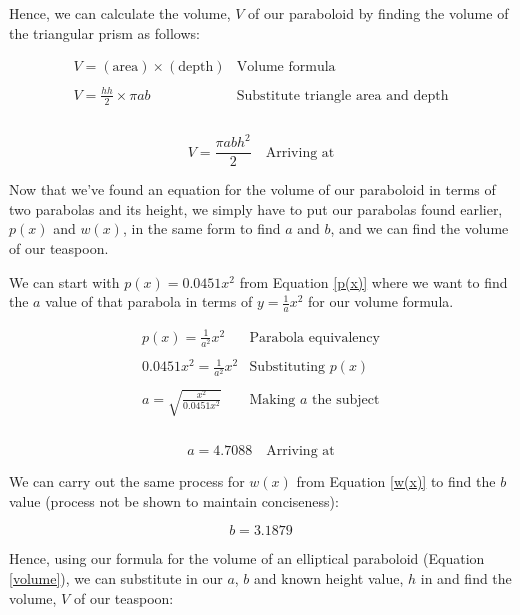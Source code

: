 \documentclass[12pt]{article}
\begin{document}
Hence, we can calculate the volume, $V$ of our paraboloid by finding the volume of the triangular prism as follows:

$$
\begin{array}{l|c}
    V = (\text{area}) \times (\text{depth}) & \text{Volume formula} \\ \\
    V = \frac{hh}{2} \times \pi ab & \text{Substitute triangle area and depth} \\ \\
 \end{array}
$$

\begin{equation}\label{volume}
    \boxed{V = \frac{\pi a b h^2}{2}}  \quad \text{Arriving at}
\end{equation}

Now that we've found an equation for the volume of our paraboloid in terms of two parabolas and its height, we simply have to put our parabolas found earlier, $p(x)$ and $w(x)$, in the same form to find $a$ and $b$, and we can find the volume of our teaspoon.

We can start with $p(x)=0.0451x^2$ from Equation \ref{p(x)} where we want to find the $a$ value of that parabola in terms of $y=\frac{1}{a}x^2$ for our volume formula.

$$
\begin{array}{l|c}
    p(x) = \frac{1}{a^2}x^2 & \text{Parabola equivalency} \\ \\
    0.0451x^2 = \frac{1}{a^2}x^2 & \text{Substituting } p(x) \\ \\
    a = \sqrt{ \frac{x^2}{0.0451x^2}} & \text{Making } a \text{ the subject} \\ \\
 \end{array}
$$

\begin{equation}\label{solve.a!}
    \boxed{a = 4.7088}  \quad \text{Arriving at}
\end{equation}

We can carry out the same process for $w(x)$ from Equation \ref{w(x)} to find the $b$ value (process not be shown to maintain conciseness):

\begin{equation}\label{solve.b!}
    \boxed{b = 3.1879}
\end{equation}

Hence, using our formula for the volume of an elliptical paraboloid (Equation \ref{volume}), we can substitute in our $a$, $b$ and known height value, $h$ in and find the volume, $V$ of our teaspoon:
\end{document}
